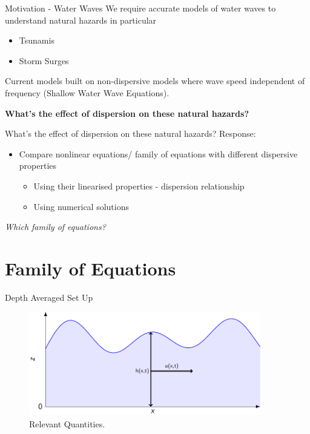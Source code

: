 \documentclass[pdf]{beamer}
\begin{document}
\begin{frame}{Motivation - Water Waves}
We require accurate models of water waves to understand natural hazards in particular
\begin{itemize}
	\item Tsunamis
	\item Storm Surges
\end{itemize}
\bigskip
Current models built on non-dispersive models where wave speed independent of frequency (Shallow Water Wave Equations). 
\pause

\bigskip
\textbf{{What's the effect of dispersion on these natural hazards?}}
\end{frame}

\begin{frame}{What's the effect of dispersion on these natural hazards?}
Response:
\begin{itemize}
	\item Compare nonlinear equations/ family of equations with different dispersive properties
	\begin{itemize}
	\item Using their linearised properties - dispersion relationship
	\item Using numerical solutions
	\end{itemize}
\end{itemize}
\bigskip
\pause
\emph{Which family of equations?}
\end{frame}


\section{Family of Equations}
\begin{frame}{Depth Averaged Set Up}
\begin{figure}
	\centering
	\includegraphics[width=0.9\textwidth]{./Pics/Tex/Explanatory/Setupplot/Waves.pdf}
	\caption{Relevant Quantities.}
\end{figure}
\end{frame}
\end{document}
